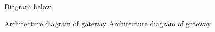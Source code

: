 \documentclass[11pt,a4paper]{article}
\begin{document}
Diagram below:

\begin{figure}[h]
\end{figure}

Architecture diagram of gateway
          Architecture diagram of gateway
\end{document}

